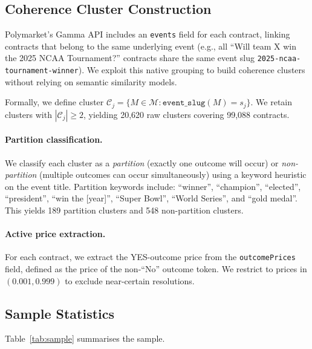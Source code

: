\documentclass[12pt,a4paper]{article}
\theoremstyle{definition}
\theoremstyle{remark}
\begin{document}
\subsection{Coherence Cluster Construction}
\label{sec:clusters}

Polymarket's Gamma API includes an \texttt{events} field for each contract,
linking contracts that belong to the same underlying event (e.g., all
``Will team X win the 2025 NCAA Tournament?'' contracts share the same
event slug \texttt{2025-ncaa-tournament-winner}).
We exploit this native grouping to build coherence clusters without relying
on semantic similarity models.

Formally, we define cluster $\mathcal{C}_j = \{M \in \mathcal{M} :
\texttt{event\_slug}(M) = s_j\}$.
We retain clusters with $|\mathcal{C}_j| \geq 2$, yielding 20{,}620 raw
clusters covering 99{,}088 contracts.

\paragraph{Partition classification.}
We classify each cluster as a \emph{partition} (exactly one outcome will
occur) or \emph{non-partition} (multiple outcomes can occur simultaneously)
using a keyword heuristic on the event title.
Partition keywords include: ``winner'', ``champion'', ``elected'',
``president'', ``win the [year]'', ``Super Bowl'', ``World Series'', and
``gold medal''.
This yields 189 partition clusters and 548 non-partition clusters.

\paragraph{Active price extraction.}
For each contract, we extract the YES-outcome price from the
\texttt{outcomePrices} field, defined as the price of the non-``No''
outcome token.
We restrict to prices in $(0.001, 0.999)$ to exclude near-certain
resolutions.

\subsection{Sample Statistics}

Table~\ref{tab:sample} summarises the sample.
\end{document}
